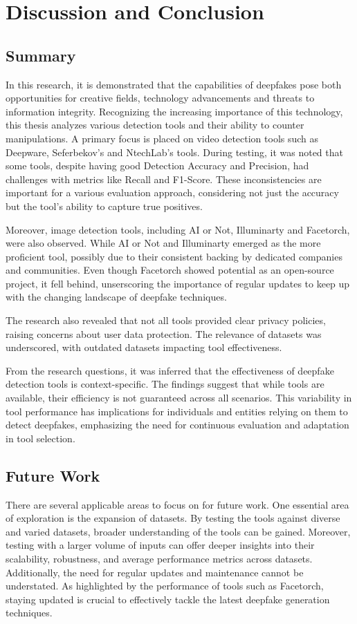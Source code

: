 
\chapter{Discussion and Conclusion}\label{chapter:conclusion}
\section{Summary}
In this research, it is demonstrated that the capabilities of deepfakes pose both
opportunities for creative fields, technology advancements and threats to information
integrity. Recognizing the increasing importance of this technology, this thesis analyzes
various detection tools and their ability to counter manipulations. A primary focus is placed
on video detection tools such as Deepware, Seferbekov's and NtechLab's tools. During testing,
it was noted that some tools, despite having good Detection Accuracy and Precision,
had challenges with metrics like Recall and F1-Score. These inconsistencies are
important for a various evaluation approach, considering not just the accuracy but the tool's ability to capture true positives.

Moreover, image detection tools, including AI or Not, Illuminarty and Facetorch, were
also observed. While AI or Not and Illuminarty emerged as the more proficient tool,
possibly due to their consistent backing by dedicated companies and communities.
Even though Facetorch showed potential as an open-source project, it fell behind,
unserscoring the importance of regular updates to keep up with the changing landscape
of deepfake techniques.

The research also revealed that not all tools provided clear privacy policies, raising
concerns about user data protection. The relevance of datasets was underscored, with
outdated datasets impacting tool effectiveness.

From the research questions, it was inferred that the effectiveness of deepfake detection
tools is context-specific. The findings suggest that while tools are available, their
efficiency is not guaranteed across all scenarios. This variability in tool performance
has implications for individuals and entities relying on them to detect deepfakes,
emphasizing the need for continuous evaluation and adaptation in tool selection.

\section{Future Work}
There are several applicable areas to focus on for future work. One essential area of
exploration is the expansion of datasets. By testing the tools against diverse and varied
datasets, broader understanding of the tools can be gained. Moreover, testing with a
larger volume of inputs can offer deeper insights into their scalability, robustness,
and average performance metrics across datasets. Additionally, the need for regular
updates and maintenance cannot be understated. As highlighted by the performance of
tools such as Facetorch, staying updated is crucial to effectively tackle the latest
deepfake generation techniques.

